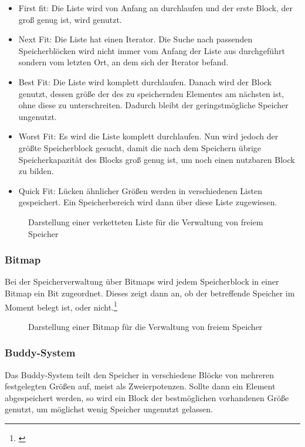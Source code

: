 \begin{itemize}
	\item First fit: Die Liste wird von Anfang an durchlaufen und der erste Block, der groß genug ist, wird genutzt.

	\item Next Fit: Die Liste hat einen Iterator. Die Suche nach passenden Speicherblöcken wird nicht immer vom Anfang der Liste aus durchgeführt sondern vom letzten Ort, an dem sich der Iterator befand.
	
	\item Best Fit: Die Liste wird komplett durchlaufen. Danach wird der Block genutzt, dessen größe der des zu speichernden Elementes am nächsten ist, ohne diese zu unterschreiten. Dadurch bleibt der geringstmögliche Speicher ungenutzt.
	
	\item Worst Fit: Es wird die Liste komplett durchlaufen. Nun wird jedoch der größte Speicherblock gesucht, damit die nach dem Speichern übrige Speicherkapazität des Blocks groß genug ist, um noch einen nutzbaren Block zu bilden.
	
	\item Quick Fit: Lücken ähnlicher Größen werden in verschiedenen Listen gespeichert. Ein Speicherbereich wird dann über diese Liste zugewiesen.
\end{itemize}

\begin{figure}[htb]
	\centering
	\caption{Darstellung einer verketteten Liste für die Verwaltung von freiem Speicher}
\end{figure}

\subsubsection{Bitmap}
Bei der Speicherverwaltung über Bitmaps wird jedem Speicherblock in einer Bitmap ein Bit zugeordnet. Dieses zeigt dann an, ob der betreffende Speicher im Moment belegt ist, oder nicht.\footnote{\cite[S.~248--249]{Tanenbaum.2016}}

\begin{figure}[htb]
	\centering
	\caption{Darstellung einer Bitmap für die Verwaltung von freiem Speicher}
\end{figure}

\subsubsection{Buddy-System}
Das Buddy-System teilt den Speicher in verschiedene Blöcke von mehreren festgelegten Größen auf, meist als Zweierpotenzen. Sollte dann ein Element abgespeichert werden, so wird ein Block der bestmöglichen vorhandenen Größe genutzt, um möglichst wenig Speicher ungenutzt gelassen.

